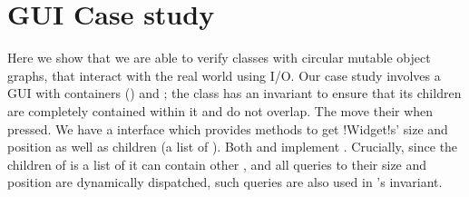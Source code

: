 \section{GUI Case study}
\label{s:case-study}

%
%
%
%
%
%
%
Here we show that we are able to verify classes with circular mutable object graphs, that interact with the real world using I/O.
Our case study involves a GUI with containers (\Q@SafeMovable@s) and \Q@Button@s;
the \Q@SafeMovable@ class has an invariant to ensure that its children are completely contained within it and do not overlap. The \Q@Button@s move their \Q@SafeMovable@ when pressed. We have a \Q@Widget@ interface which provides methods to get \Q!Widget!s' size and position as well as children (a list of \Q@Widget@s). Both \Q@SafeMovable@s and \Q@Button@s implement \Q@Widget@. Crucially, since the children of \Q@SafeMovable@ is a list of \Q@Widget@s it can contain other \Q@SafeMovable@s, and all queries to their size and position are dynamically dispatched, such queries are also used in \Q@SafeMovable@'s invariant.
